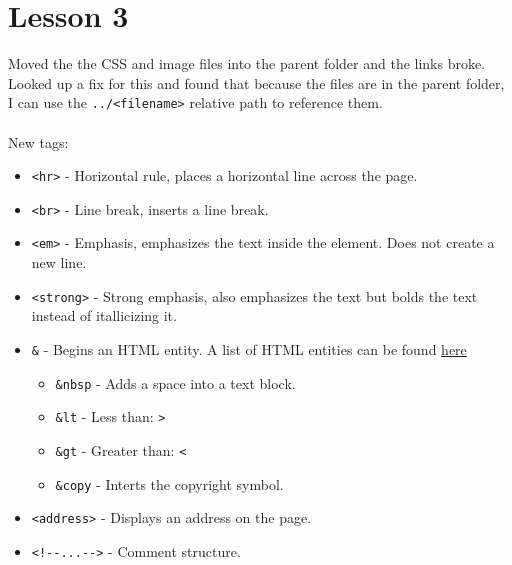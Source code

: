\documentclass{article}
\begin{document}
\section{Lesson 3} \label{sec:L3}
Moved the the CSS and image files into the parent folder and the links broke.
Looked up a fix for this and found that because
the files are in the parent folder, I can use the \verb|../<filename>| relative path to reference them.\\
\\
New tags:
\begin{itemize}
    \item \verb|<hr>| - Horizontal rule, places a horizontal line across the page.
    \item \verb|<br>| - Line break, inserts a line break.
    \item \verb|<em>| - Emphasis, emphasizes the text inside the element. Does not create a new line.
    \item \verb|<strong>| - Strong emphasis, also emphasizes the text but bolds the text instead of itallicizing it.
    \item \verb|&| - Begins an HTML entity. A list of HTML entities can be found \href{https://html.spec.whatwg.org/multipage/named-characters.html#named-character-references}{here}
    \begin{itemize}
        \item \verb|&nbsp| - Adds a space into a text block.
        \item \verb|&lt| - Less than: \verb|>|
        \item \verb|&gt| - Greater than: \verb|<|
        \item \verb|&copy| - Interts the copyright symbol.
    \end{itemize}
    \item \verb|<address>| - Displays an address on the page.
    \item \verb|<!--...-->| - Comment structure.
\end{itemize}
\end{document}
